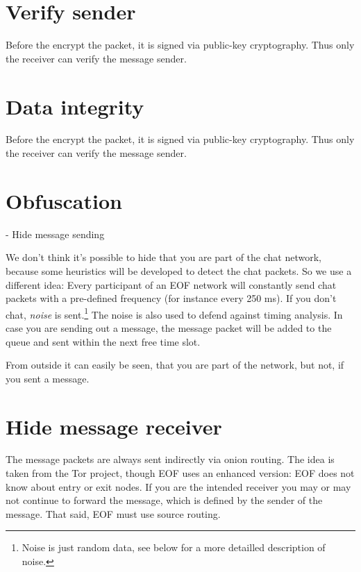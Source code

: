 \section{Verify sender}
Before the encrypt the packet, it is signed via public-key
cryptography\cite{pgp-1}. Thus only the receiver can verify the message sender.
\section{Data integrity}
Before the encrypt the packet, it is signed via public-key
cryptography\cite{pgp-1}. Thus only the receiver can verify the message sender.
\section{Obfuscation}
- Hide message sending

We don't think it's possible to hide that you are part of the chat network,
because some heuristics will be developed to detect the chat packets.
So we use a different idea:
Every participant of an EOF network will constantly send chat packets
with a pre-defined frequency (for instance every 250 ms).
If you don't chat, \emph{noise} is sent.\footnote{Noise is just random
data, see below for a more detailled description of noise.}
The noise is also used to defend against timing analysis.
In case you are sending out a message, the message packet will be added to the
queue and sent within the next free time slot.

From outside it can easily be seen, that you are part of the network,
but not, if you sent a message.
\section{Hide message receiver}
The message packets are always sent indirectly via onion routing\cite{onion-1}.
The idea is taken from the Tor project\cite{tor-1}, though EOF uses an enhanced
version: EOF does not know about entry or exit nodes. If you are the intended
receiver you may or may not continue to forward the message, which is defined
by the sender of the message. That said, EOF must use source
routing\cite{source-routing-1}.

